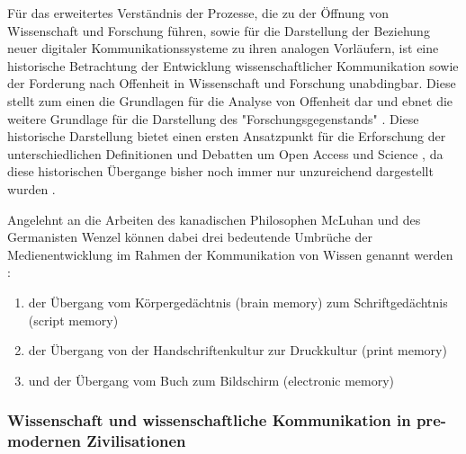 Für das erweitertes Verständnis der Prozesse, die zu der Öffnung von Wissenschaft und Forschung führen, sowie für die Darstellung der Beziehung neuer digitaler Kommunikationssysteme zu ihren analogen Vorläufern, ist eine historische Betrachtung der Entwicklung wissenschaftlicher Kommunikation sowie der Forderung nach Offenheit in Wissenschaft und Forschung unabdingbar. Diese stellt zum einen die Grundlagen für die Analyse von Offenheit dar und ebnet die weitere Grundlage für die Darstellung  des "Forschungsgegenstands" \cite{cite:10}. Diese historische Darstellung bietet einen ersten Ansatzpunkt für die Erforschung der unterschiedlichen Definitionen und Debatten um Open Access und Science \cite{Scheliga_2014}, da diese historischen Übergange bisher noch immer nur unzureichend dargestellt wurden \cite{CREATe_2014}.

Angelehnt an die Arbeiten des kanadischen Philosophen McLuhan und des Germanisten Wenzel können dabei drei bedeutende Umbrüche der Medienentwicklung im Rahmen der Kommunikation von Wissen genannt werden \cite{wunderlich_2008_buchdruck} \cite{wenzel_mediengeschichte_2007}:
\begin{enumerate}
\item der Übergang vom Körpergedächtnis (brain memory) zum Schriftgedächtnis (script memory)
\item der Übergang von der Handschriftenkultur zur Druckkultur (print memory)
\item und der Übergang vom Buch zum Bildschirm (electronic memory)
\end{enumerate}

\subsubsection{Wissenschaft und wissenschaftliche Kommunikation in pre-modernen Zivilisationen}

